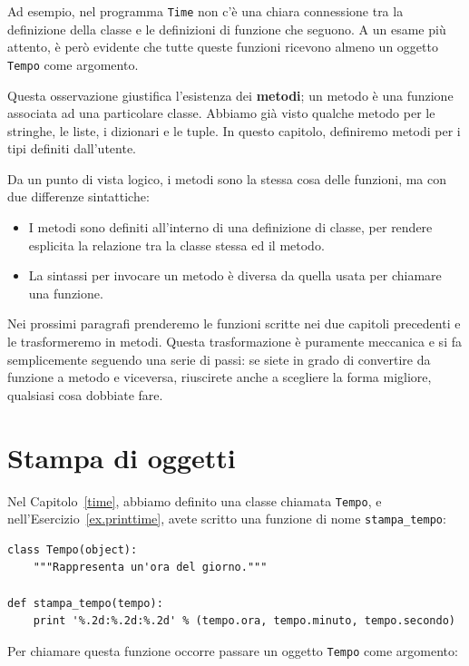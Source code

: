 \documentclass[10pt]{book}
\begin{document}
Ad esempio, nel programma {\tt Time} non c'è una chiara connessione tra la definizione della classe e le definizioni di funzione che seguono. A un esame più attento, è però evidente che tutte queste funzioni ricevono almeno un oggetto {\tt Tempo} come argomento.

Questa osservazione giustifica l'esistenza dei {\bf metodi}; un metodo è una funzione associata ad una particolare classe. Abbiamo già visto qualche metodo per le stringhe, le liste, i dizionari e le tuple. In questo capitolo, definiremo metodi per i tipi definiti dall'utente.

Da un punto di vista logico, i metodi sono la stessa cosa delle funzioni, ma con due differenze sintattiche:

\begin{itemize}

\item I metodi sono definiti all'interno di una definizione di classe, per      rendere esplicita la relazione tra la classe stessa ed il metodo.

\item La sintassi per invocare un metodo è diversa da quella usata per       chiamare una funzione.

\end{itemize}

Nei prossimi paragrafi prenderemo le funzioni scritte nei due capitoli    precedenti e le trasformeremo in metodi. Questa trasformazione è puramente meccanica e si fa semplicemente seguendo una serie di passi: se siete in grado di convertire da funzione a metodo e viceversa, riuscirete anche a scegliere la forma migliore, qualsiasi cosa dobbiate fare.


\section{Stampa di oggetti}

Nel Capitolo~\ref{time}, abbiamo definito una classe chiamata
{\tt Tempo}, e nell'Esercizio~\ref{ex.printtime}, avete scritto una funzione di nome \verb"stampa_tempo":

\begin{verbatim}
class Tempo(object):
    """Rappresenta un'ora del giorno."""

def stampa_tempo(tempo):
    print '%.2d:%.2d:%.2d' % (tempo.ora, tempo.minuto, tempo.secondo)
\end{verbatim}
%
Per chiamare questa funzione occorre passare un oggetto {\tt Tempo} come    argomento:
\end{document}
